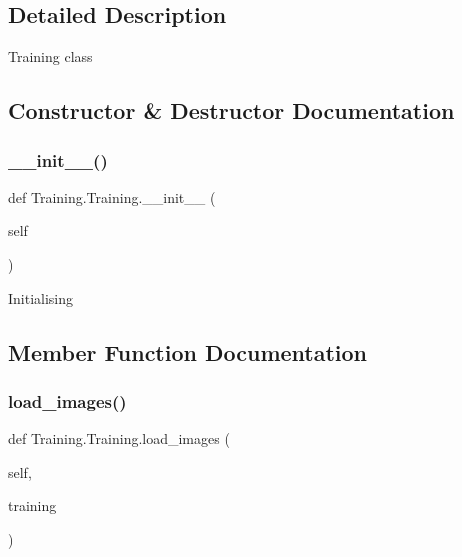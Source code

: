 \subsection{Detailed Description}
\begin{DoxyVerb}Training class
\end{DoxyVerb}
 

\subsection{Constructor \& Destructor Documentation}
\mbox{\label{class_training_1_1_training_aa5c3c606edf57118d04ce14e3bc5704d}} 
\subsubsection{\texorpdfstring{\+\_\+\+\_\+init\+\_\+\+\_\+()}{\_\_init\_\_()}}
{\footnotesize\ttfamily def Training.\+Training.\+\_\+\+\_\+init\+\_\+\+\_\+ (\begin{DoxyParamCaption}\item[{}]{self }\end{DoxyParamCaption})}

\begin{DoxyVerb}Initialising
\end{DoxyVerb}
 

\subsection{Member Function Documentation}
\mbox{\label{class_training_1_1_training_a6df4e220dd5cbd4769a84852fc4e9d60}} 
\subsubsection{\texorpdfstring{load\+\_\+images()}{load\_images()}}
{\footnotesize\ttfamily def Training.\+Training.\+load\+\_\+images (\begin{DoxyParamCaption}\item[{}]{self,  }\item[{}]{training }\end{DoxyParamCaption})}

